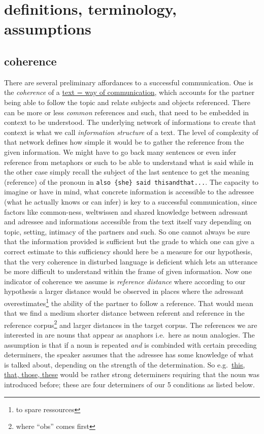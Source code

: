 \documentclass[
  12pt,
  oneside]{book}
\begin{document}
\section{definitions, terminology, assumptions}\label{definitions-terminology-assumptions}

\subsection{coherence}\label{coherence}

There are several preliminary affordances to a successful communication. One is the \emph{coherence} of a \href{}{text = way of communication}, which accounts for the partner being able to follow the topic and relate subjects and objects referenced. There can be more or less \emph{common} references and such, that need to be embedded in context to be understood. The underlying network of informations to create that context is what we call \emph{information structure} of a text. The level of complexity of that network defines how simple it would be to gather the reference from the given information. We might have to go back many sentences or even infer reference from metaphors or such to be able to understand what is said while in the other case simply recall the subject of the last sentence to get the meaning (reference) of the pronoun in \texttt{also\ \{she\}\ said\ thisandthat...}.
The capacity to imagine or have in mind, what concrete information is accessible to the adressee (what he actually knows or can infer) is key to a successful communication, since factors like common-ness, weltwissen and shared knowledge between adressant and adressee and informations accessible from the text itself vary depending on topic, setting, intimacy of the partners and such. So one cannot always be sure that the information provided is sufficient but the grade to which one can give a correct estimate to this sufficiency should here be a measure for our hypothesis, that the very coherence in disturbed language is deficient which lets an utterance be more difficult to understand within the frame of given information.
Now one indicator of coherence we assume is \emph{reference distance} where according to our hypothesis a larger distance would be observed in places where the adressant overestimates\footnote{to spare ressources} the ability of the partner to follow a reference. That would mean that we find a medium shorter distance between referent and reference in the reference corpus\footnote{where ``obs'' comes first} and larger distances in the target corpus. The references we are interested in are nouns that appear as anaphors i.e.~here as noun analogies. The assumption is that if a noun is repeated \emph{and} is combinded with certain preceding determiners, the speaker assumes that the adressee has some knowledge of what is talked about, depending on the strength of the determination. So e.g.~\href{}{this, that, those, these} would be rather strong determiners requiring that the noun was introduced before; these are four determiners of our 5 conditions as listed below.
\end{document}
